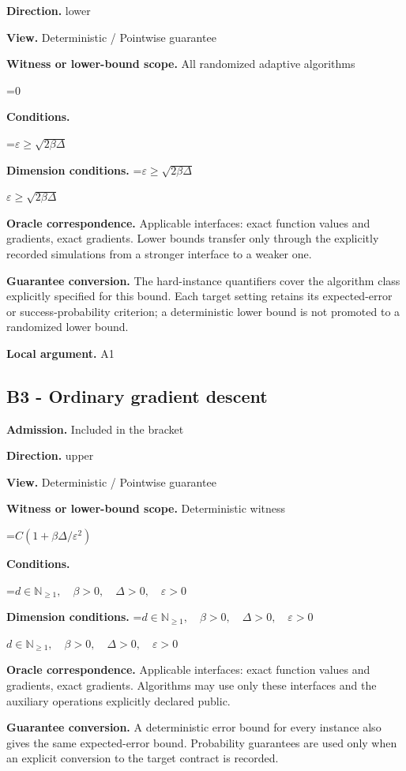 \documentclass[10pt,a4paper]{article}
\newcommand{\AtlasMath}[1]{\par\begingroup\centering\setbox0=\hbox{$\displaystyle #1$}\ifdim\wd0>1.4\linewidth\typeout{ATLAS WIDE FORMULA: \the\wd0}\fi\ifdim\wd0>\linewidth\resizebox{\linewidth}{!}{\box0}\else\box0\fi\par\endgroup}
\newcommand{\AtlasInlineMath}[1]{\begingroup\setbox0=\hbox{$#1$}\ifdim\wd0>.4\linewidth\endgroup\AtlasMath{#1}\else\endgroup$#1$\fi}
\begin{document}
\textbf{Direction.} lower

\textbf{View.} Deterministic / Pointwise guarantee

\textbf{Witness or lower-bound scope.} All randomized adaptive algorithms

\AtlasMath{0}
\textbf{Conditions.} 
\AtlasMath{\varepsilon\ge\sqrt{2\beta\Delta}}


\textbf{Dimension conditions.} \AtlasInlineMath{\varepsilon\ge\sqrt{2\beta\Delta}}

\textbf{Oracle correspondence.} Applicable interfaces: exact function values and gradients, exact gradients. Lower bounds transfer only through the explicitly recorded simulations from a stronger interface to a weaker one.

\textbf{Guarantee conversion.} The hard-instance quantifiers cover the algorithm class explicitly specified for this bound. Each target setting retains its expected-error or success-probability criterion; a deterministic lower bound is not promoted to a randomized lower bound.

\textbf{Local argument.} A1

\subsection{B3 - Ordinary gradient descent}
\textbf{Admission.} Included in the bracket

\textbf{Direction.} upper

\textbf{View.} Deterministic / Pointwise guarantee

\textbf{Witness or lower-bound scope.} Deterministic witness

\AtlasMath{C(1+\beta\Delta/\varepsilon^2)}
\textbf{Conditions.} 
\AtlasMath{d\in\mathbb{N}_{\ge1},\quad \beta>0,\quad \Delta>0,\quad \varepsilon>0}


\textbf{Dimension conditions.} \AtlasInlineMath{d\in\mathbb{N}_{\ge1},\quad \beta>0,\quad \Delta>0,\quad \varepsilon>0}

\textbf{Oracle correspondence.} Applicable interfaces: exact function values and gradients, exact gradients. Algorithms may use only these interfaces and the auxiliary operations explicitly declared public.

\textbf{Guarantee conversion.} A deterministic error bound for every instance also gives the same expected-error bound. Probability guarantees are used only when an explicit conversion to the target contract is recorded.
\end{document}
